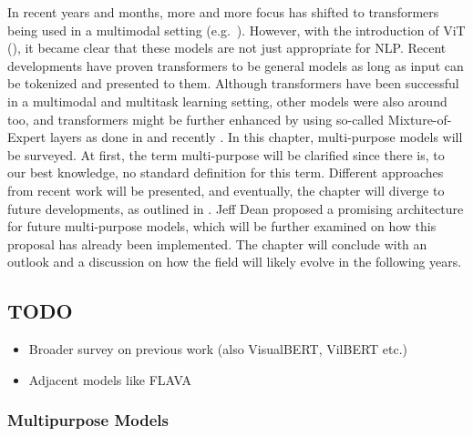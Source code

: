 \documentclass[
]{krantz}
\providecommand{\tightlist}{%
  \setlength{\itemsep}{0pt}\setlength{\parskip}{0pt}}
\begin{document}
In recent years and months, more and more focus has shifted to transformers being used in a multimodal setting (e.g.~\citet{Lu2019}). However, with the introduction of ViT (\citet{Dosovitskiy2020}), it became clear that these models are not just appropriate for NLP. Recent developments have proven transformers to be general models as long as input can be tokenized and presented to them. Although transformers have been successful in a multimodal and multitask learning setting, other models were also around too, and transformers might be further enhanced by using so-called Mixture-of-Expert layers as done in \citet{Fedus2021} and recently \citet{Mustafa2022}.
In this chapter, multi-purpose models will be surveyed. At first, the term multi-purpose will be clarified since there is, to our best knowledge, no standard definition for this term. Different approaches from recent work will be presented, and eventually, the chapter will diverge to future developments, as outlined in \citet{Dean2021}. Jeff Dean proposed a promising architecture for future multi-purpose models, which will be further examined on how this proposal has already been implemented. The chapter will conclude with an outlook and a discussion on how the field will likely evolve in the following years.

\hypertarget{todo-1}{%
\subsection{TODO}\label{todo-1}}

\begin{itemize}
\tightlist
\item
  Broader survey on previous work (also VisualBERT, VilBERT etc.)
\item
  Adjacent models like FLAVA
\end{itemize}

\hypertarget{multipurpose-models}{%
\subsubsection{Multipurpose Models}\label{multipurpose-models}}
\end{document}
